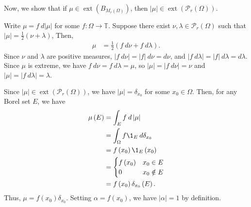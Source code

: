 \documentclass[10pt]{mypackage}
\begin{document}
\begin{example}
  Now, we show that if $\mu\in \operatorname{ext}\left( B_{M_r\left( \Omega \right)} \right)$, then $\left\vert \mu \right\vert\in \operatorname{ext}\left( \mathcal{P}_{r}\left( \Omega \right) \right)$.\newline

  Write $\mu = f\:d\left\vert \mu \right\vert$ for some $f\colon \Omega\rightarrow \mathbb{T}$. Suppose there exist $\nu,\lambda\in \mathcal{P}_{r}\left( \Omega \right)$ such that $\left\vert \mu \right\vert = \frac{1}{2}\left( \nu + \lambda \right)$, Then,
  \begin{align*}
    \mu &= \frac{1}{2}\left( f\:d\nu + f\:d\lambda \right).
  \end{align*}
  Since $\nu$ and $\lambda$ are positive measures, $\left\vert f\:d\nu \right\vert = \left\vert f \right\vert\:d\nu = d\nu$, and $\left\vert f\:d\lambda \right\vert = \left\vert f \right\vert\:d\lambda = d\lambda$. Since $\mu$ is extreme, we have $f\:d\nu = f\:d\lambda = \mu$, so $\left\vert \mu \right\vert = \left\vert f\:d\nu \right\vert = \nu$ and $\left\vert \mu \right\vert = \left\vert f\:d\lambda \right\vert = \lambda$.\newline

  Since $\left\vert \mu \right\vert \in \operatorname{ext}\left( \mathcal{P}_{r}\left( \Omega \right) \right)$, we have $\left\vert \mu \right\vert = \delta_{x_0}$ for some $x_0\in\Omega$. Then, for any Borel set $E$, we have
  \begin{align*}
    \mu\left( E \right) &= \int_{E}^{} f\:d\left\vert \mu \right\vert\\
                        &= \int_{\Omega}^{} f\1_{E}\:d\delta_{x_0}\\
                        &= f\left( x_0 \right)\1_{E}\left( x_0 \right)\\
                        &= \begin{cases}
                          f\left( x_0 \right) & x_0\in E\\
                          0 & x_0\notin E
                        \end{cases}\\
                        &= f\left( x_0 \right)\delta_{x_0}\left( E \right).
  \end{align*}
  Thus, $\mu = f\left( x_0 \right)\delta_{x_0}$. Setting $\alpha = f\left( x_0 \right)$, we have $\left\vert \alpha \right\vert = 1$ by definition.
\end{example}
\end{document}
